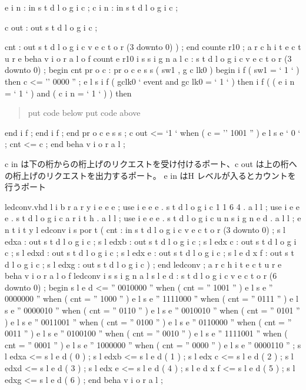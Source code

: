 \documentclass[letterpaper,10pt,dvipdfmx]{sphinxmanual}
\begin{document}
e i n : in s t d l o g i c ;
c i n : in s t d l o g i c ;

c out : out s t d l o g i c ;

cnt : out s t d l o g i c v e c t o r (3 downto 0)
) ;
end counte r10 ;
a r c h i t e c t u r e beha v i o r a l o f count e r10 i s
s i g n a l c : s t d l o g i c v e c t o r (3 downto 0) ;
begin
cnt pr o c : pr o c e s s ( sw1 , g c lk0 )
begin
i f ( sw1 = ` 1 ` ) then
c \textless{}= '' 0000 '' ;
e l s i f ( gclk0 ` event and gc lk0 = ` 1 ` ) then
i f ( ( e i n = ` 1 ` ) and ( c i n = ` 1 ` ) ) then
\begin{quote}

put code below
put code above
\end{quote}

end i f ;
end i f ;
end pr o c e s s ;
c out \textless{}= `1 ` when ( c = '' 1001 '' )
e l s e ` 0 ` ;
cnt \textless{}= c ;
end beha v i o r a l ;

c in は下の桁からの桁上げのリクエストを受け付けるポート、c out は上の桁への桁上げのリクエストを出力するポート。
e in はH レベルが入るとカウントを行うポート

ledconv.vhd
l i b r a r y i e e e ;
use i e e e . s t d l o g i c 1 1 6 4 . a l l ;
use i e e e . s t d l o g i c a r i t h . a l l ;
use i e e e . s t d l o g i c u n s i g n e d . a l l ;
e n t i t y l edconv i s
por t (
cnt : in s t d l o g i c v e c t o r (3 downto 0) ;
s l edxa : out s t d l o g i c ;
s l edxb : out s t d l o g i c ;
s l edx c : out s t d l o g i c ;
s l edxd : out s t d l o g i c ;
s l edx e : out s t d l o g i c ;
s l e d x f : out s t d l o g i c ;
s l edxg : out s t d l o g i c
) ;
end ledconv ;
a r c h i t e c t u r e beha v i o r a l o f ledconv i s
s i g n a l s l e d : s t d l o g i c v e c t o r (6 downto 0) ;
begin
s l e d \textless{}= '' 0010000 '' when ( cnt = '' 1001 '' )
e l s e '' 0000000 '' when ( cnt = '' 1000 '' )
e l s e '' 1111000 '' when ( cnt = '' 0111 '' )
e l s e '' 0000010 '' when ( cnt = '' 0110 '' )
e l s e '' 0010010 '' when ( cnt = '' 0101 '' )
e l s e '' 0011001 '' when ( cnt = '' 0100 '' )
e l s e '' 0110000 '' when ( cnt = '' 0011 '' )
e l s e '' 0100100 '' when ( cnt = '' 0010 '' )
e l s e '' 1111001 '' when ( cnt = '' 0001 '' )
e l s e '' 1000000 '' when ( cnt = '' 0000 '' )
e l s e '' 0000110 '' ;
s l edxa \textless{}= s l e d ( 0 ) ;
s l edxb \textless{}= s l e d ( 1 ) ;
s l edx c \textless{}= s l e d ( 2 ) ;
s l edxd \textless{}= s l e d ( 3 ) ;
s l edx e \textless{}= s l e d ( 4 ) ;
s l e d x f \textless{}= s l e d ( 5 ) ;
s l edxg \textless{}= s l e d ( 6 ) ;
end beha v i o r a l ;
\end{document}
